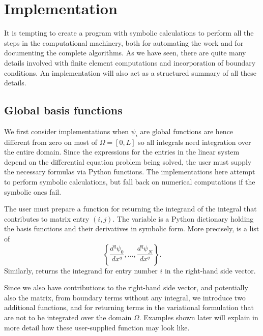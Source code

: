 \documentclass[../main.tex]{subfiles}
\begin{document}
	
		\chapter{Implementation}
\label{chap:chap_16}

\noindent It is tempting to create a program with symbolic calculations to perform all the steps in the computational machinery, both for automating the work and for documenting the complete algorithms. As we have seen, there are quite many details involved with finite element computations and incorporation of boundary conditions. An implementation will also act as a structured summary of all these details.

	\section[Implementation]{Global basis functions}
		\label{sec:sec_16_1}
		\noindent We first consider implementations when $\psi_{i}$ are global functions are hence different from zero on most of $\Omega=[0, L]$ so all integrals need integration over the entire domain. Since the expressions for the entries in the linear system depend on the differential equation problem being solved, the user must supply the necessary formulas via Python functions. The implementations here attempt to perform symbolic calculations, but fall back on numerical computations if the symbolic ones fail.
		
		The user must prepare a function  for returning the integrand of the integral that contributes to matrix entry $(i, j)$. The  variable is a Python dictionary holding the basis functions and their derivatives in symbolic form. More precisely,  is a list of
		$$
		\left\{\frac{d^{q} \psi_{0}}{d x^{q}}, \ldots, \frac{d^{q} \psi_{N}}{d x^{q}}\right\} .
		$$
		Similarly,  returns the integrand for entry number $i$ in the right-hand side vector.
		
		Since we also have contributions to the right-hand side vector, and potentially also the matrix, from boundary terms without any integral, we introduce two additional functions,  and  for returning terms in the variational formulation that are not to be integrated over the domain $\Omega$. Examples shown later will explain in more detail how these user-supplied function may look like.
		
\end{document}
